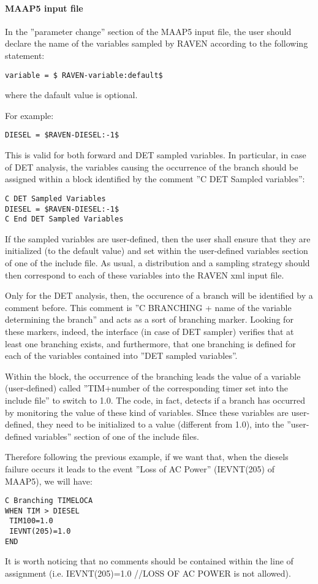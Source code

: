 \paragraph{MAAP5 input file}
In the ''parameter change'' section of the MAAP5 input file, the user should declare
the name of the variables sampled by RAVEN according to the following statement:
\begin{lstlisting}[style=XML]
 variable = $ RAVEN-variable:default$
\end{lstlisting}
where the dafault value is optional.

For example:
\begin{lstlisting}[style=XML]
DIESEL = $RAVEN-DIESEL:-1$
\end{lstlisting}
This is valid for both forward and DET sampled variables.
In particular, in case of DET analysis, the variables causing the occurrence of the branch should be
assigned within a block identified by the comment ''C DET Sampled variables'':
\begin{lstlisting}[style=XML]
C DET Sampled Variables
DIESEL = $RAVEN-DIESEL:-1$
C End DET Sampled Variables
\end{lstlisting}
If the sampled variables are user-defined, then the user shall ensure that they are initialized
(to the default value) and set within the user-defined variables section of one of the include
file.
As usual, a distribution and a sampling strategy should then correspond to each of these variables
into the RAVEN xml input file.

Only for the DET analysis, then, the occurence of a branch will be identified by a comment before. This comment is
 ''C BRANCHING + name of the variable determining the branch'' and acts as a sort of branching marker.
Looking for these markers, indeed, the interface (in case of DET sampler) verifies that at least
one branching exists, and furthermore, that one branching is defined for each of the
variables contained into ''DET sampled variables''.

Within the block, the occurrence of the branching leads the value of a variable (user-defined)
called ''TIM+number of the corresponding timer set into
the include file'' to switch to 1.0. The code, in fact, detects if a branch has occurred by monitoring
the value of these kind of variables. SInce these variables are user-defined, they need to be
initialized to a value (different from 1.0), into the ''user-defined variables'' section of one of the include
files.

Therefore following the previous example, if we want that, when the diesels failure occurs it leads
to the event ''Loss of AC Power'' (IEVNT(205) of MAAP5), we will have:
\begin{lstlisting}[style=XML]
C Branching TIMELOCA
WHEN TIM > DIESEL
 TIM100=1.0
 IEVNT(205)=1.0
END
\end{lstlisting}
It is worth noticing that no comments should be contained within the line of assignment
(i.e. IEVNT(205)=1.0 //LOSS OF AC POWER is not allowed).

